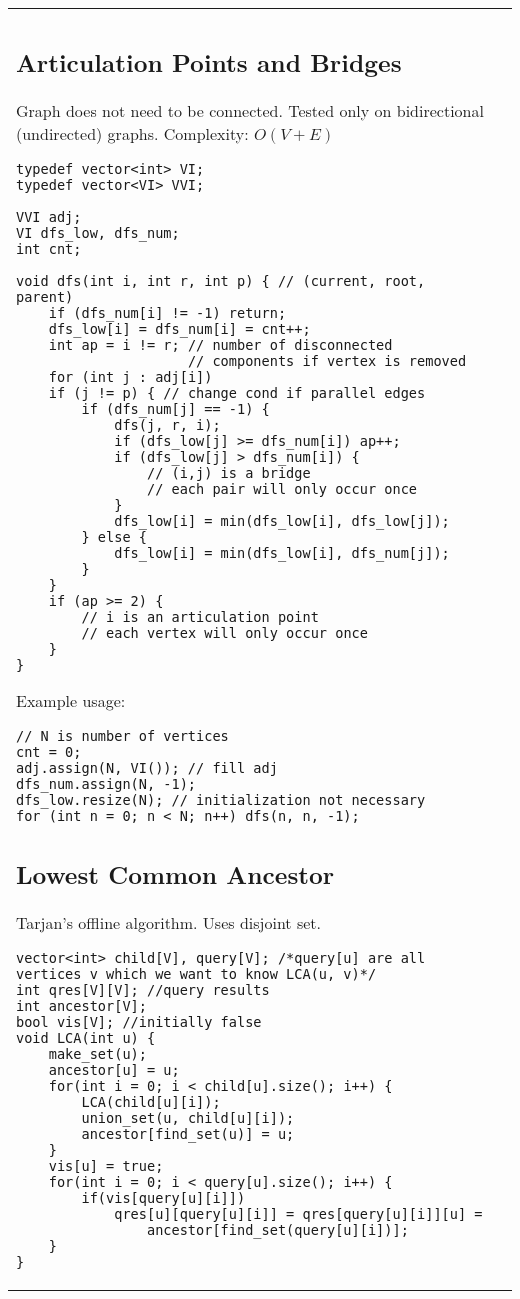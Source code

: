 \documentclass[letterpaper]{article}
\begin{document}
\begin{tabular}{@{}p{10cm}p{7.5cm}@{}}
\subsection{Articulation Points and Bridges}
Graph does not need to be connected. Tested only on bidirectional (undirected) graphs. Complexity: $O\left(V + E\right)$

\begin{lstlisting}
typedef vector<int> VI;
typedef vector<VI> VVI;

VVI adj;
VI dfs_low, dfs_num;
int cnt;

void dfs(int i, int r, int p) { // (current, root, parent)
	if (dfs_num[i] != -1) return;
	dfs_low[i] = dfs_num[i] = cnt++;
	int ap = i != r; // number of disconnected
	                 // components if vertex is removed
	for (int j : adj[i])
	if (j != p) { // change cond if parallel edges
		if (dfs_num[j] == -1) {
			dfs(j, r, i);
			if (dfs_low[j] >= dfs_num[i]) ap++;
			if (dfs_low[j] > dfs_num[i]) {
				// (i,j) is a bridge
				// each pair will only occur once
			}
			dfs_low[i] = min(dfs_low[i], dfs_low[j]);
		} else {
			dfs_low[i] = min(dfs_low[i], dfs_num[j]);
		}
	}
	if (ap >= 2) {
		// i is an articulation point
		// each vertex will only occur once
	}
}
\end{lstlisting}

Example usage:
\begin{lstlisting}
// N is number of vertices
cnt = 0;
adj.assign(N, VI()); // fill adj
dfs_num.assign(N, -1);
dfs_low.resize(N); // initialization not necessary
for (int n = 0; n < N; n++) dfs(n, n, -1);
\end{lstlisting}

\subsection{Lowest Common Ancestor}
Tarjan's offline algorithm. Uses disjoint set.

\begin{lstlisting}
vector<int> child[V], query[V]; /*query[u] are all 
vertices v which we want to know LCA(u, v)*/
int qres[V][V]; //query results
int ancestor[V];
bool vis[V]; //initially false
void LCA(int u) {
	make_set(u);
	ancestor[u] = u;
	for(int i = 0; i < child[u].size(); i++) {
		LCA(child[u][i]);
		union_set(u, child[u][i]);
		ancestor[find_set(u)] = u;
	}
	vis[u] = true;
	for(int i = 0; i < query[u].size(); i++) {
		if(vis[query[u][i]])
			qres[u][query[u][i]] = qres[query[u][i]][u] = 
				ancestor[find_set(query[u][i])];
	}
}
\end{lstlisting}
&

\end{tabular}
\end{document}
